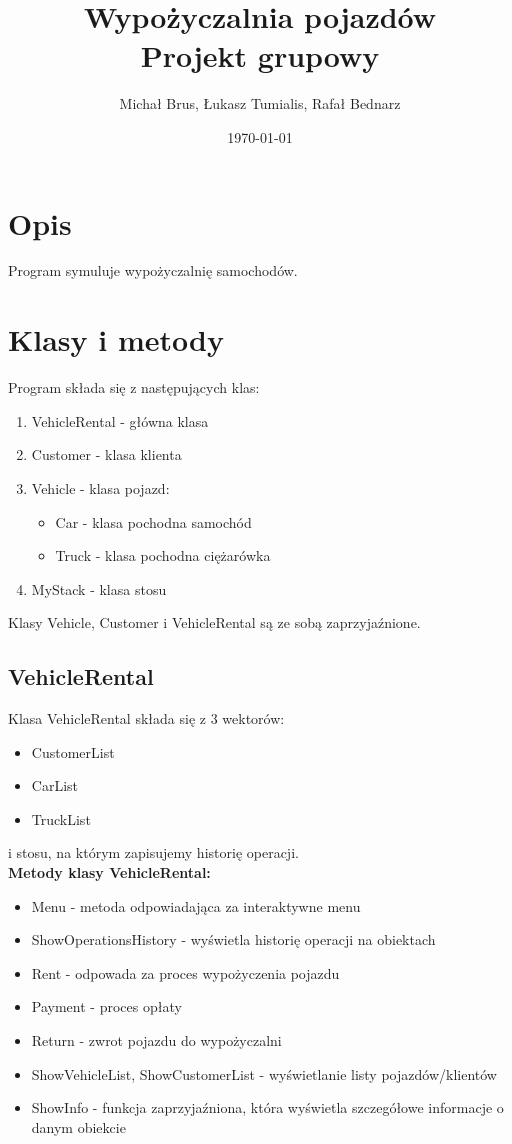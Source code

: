 \documentclass[10pt, a4paper] {article}
\title {\textbf{Wypożyczalnia pojazdów} \\
Projekt grupowy}
\author {Michał Brus, Łukasz Tumialis, Rafał Bednarz}
\date {\today}
\begin{document}
\maketitle

\section {Opis}
Program symuluje wypożyczalnię samochodów.
\section{Klasy i metody}
Program składa się z następujących klas:
\begin {enumerate}
	\item VehicleRental - główna klasa
	\item Customer - klasa klienta
	\item Vehicle - klasa pojazd:
	\begin {itemize}
		\item Car - klasa pochodna samochód
		\item Truck - klasa pochodna ciężarówka
	\end{itemize}
	\item MyStack - klasa stosu
\end {enumerate} 


Klasy Vehicle, Customer i VehicleRental są ze sobą zaprzyjaźnione.

\subsection {VehicleRental}
Klasa VehicleRental składa się z 3 wektorów:
\begin{itemize}
	\item CustomerList
	\item CarList
	\item TruckList
\end{itemize}
 i stosu, na którym zapisujemy historię operacji. \\
 
 
\textbf{Metody klasy VehicleRental:}
\begin{itemize}
	\item Menu - metoda odpowiadająca za interaktywne menu
	\item ShowOperationsHistory - wyświetla historię operacji na obiektach
	\item Rent - odpowada za proces wypożyczenia pojazdu
	\item Payment - proces opłaty
	\item Return - zwrot pojazdu do wypożyczalni
	\item ShowVehicleList, ShowCustomerList - wyświetlanie listy pojazdów/klientów
	\item ShowInfo - funkcja zaprzyjaźniona, która wyświetla szczegółowe informacje o danym obiekcie
\end{itemize}
\end{document}
